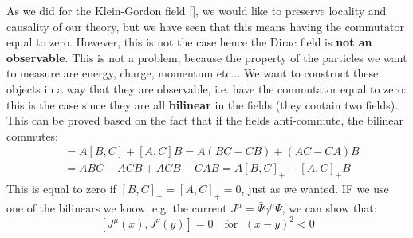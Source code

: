 \documentclass[../main.tex]{subfiles}
\begin{document}
As we did for the Klein-Gordon field [], we would like to preserve locality and causality of our theory, but we have seen that this means having the commutator equal to zero. However, this is not the case hence the Dirac field is \textbf{not an observable}. This is not a problem, because the property of the particles we want to measure are energy, charge, momentum etc... We want to construct these objects in a way that they are observable, i.e. have the commutator equal to zero: this is the case since they are all \textbf{bilinear} in the fields (they contain two fields). This can be proved based on the fact that if the fields anti-commute, the bilinear commutes:
\begin{align*}
[AB,C]&=A[B,C]+[A,C]B=A(BC-CB)+(AC-CA)B\\
&=ABC-ACB+ACB-CAB=A[B,C]_+-[A,C]_+B
\end{align*}
This is equal to zero if $[B,C]_+=[A,C]_+=0$, just as we wanted. IF we use one of the bilinears we know, e.g. the current $J^\mu=\bar{\Psi}\gamma^\mu\Psi$, we can show that:
\[
[J^\mu(x),J^\nu(y)]=0 \quad \text{for }\;(x-y)^2<0
\]
\end{document}
